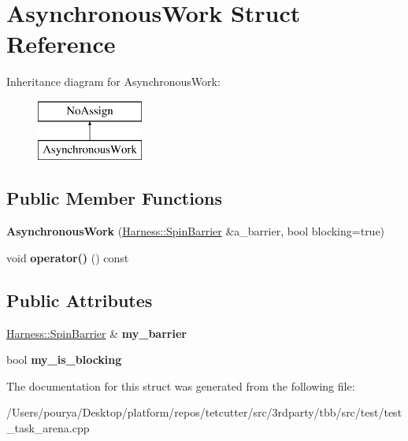 \hypertarget{structAsynchronousWork}{}\section{Asynchronous\+Work Struct Reference}
\label{structAsynchronousWork}
Inheritance diagram for Asynchronous\+Work\+:\begin{figure}[H]
\begin{center}
\leavevmode
\includegraphics[height=2.000000cm]{structAsynchronousWork}
\end{center}
\end{figure}
\subsection*{Public Member Functions}
\begin{DoxyCompactItemize}
\item 
\hypertarget{structAsynchronousWork_a2574ac0c8fe18567041f2a5d2d3295a5}{}{\bfseries Asynchronous\+Work} (\hyperlink{classHarness_1_1SpinBarrier}{Harness\+::\+Spin\+Barrier} \&a\+\_\+barrier, bool blocking=true)\label{structAsynchronousWork_a2574ac0c8fe18567041f2a5d2d3295a5}

\item 
\hypertarget{structAsynchronousWork_ab1326beda6f296d76c642bc08cff8e99}{}void {\bfseries operator()} () const \label{structAsynchronousWork_ab1326beda6f296d76c642bc08cff8e99}

\end{DoxyCompactItemize}
\subsection*{Public Attributes}
\begin{DoxyCompactItemize}
\item 
\hypertarget{structAsynchronousWork_ab44abe0e45533051295990d8e3cb8840}{}\hyperlink{classHarness_1_1SpinBarrier}{Harness\+::\+Spin\+Barrier} \& {\bfseries my\+\_\+barrier}\label{structAsynchronousWork_ab44abe0e45533051295990d8e3cb8840}

\item 
\hypertarget{structAsynchronousWork_a4e5047bf66c272423ed777d8b9b7638c}{}bool {\bfseries my\+\_\+is\+\_\+blocking}\label{structAsynchronousWork_a4e5047bf66c272423ed777d8b9b7638c}

\end{DoxyCompactItemize}


The documentation for this struct was generated from the following file\+:\begin{DoxyCompactItemize}
\item 
/\+Users/pourya/\+Desktop/platform/repos/tetcutter/src/3rdparty/tbb/src/test/test\+\_\+task\+\_\+arena.\+cpp\end{DoxyCompactItemize}
